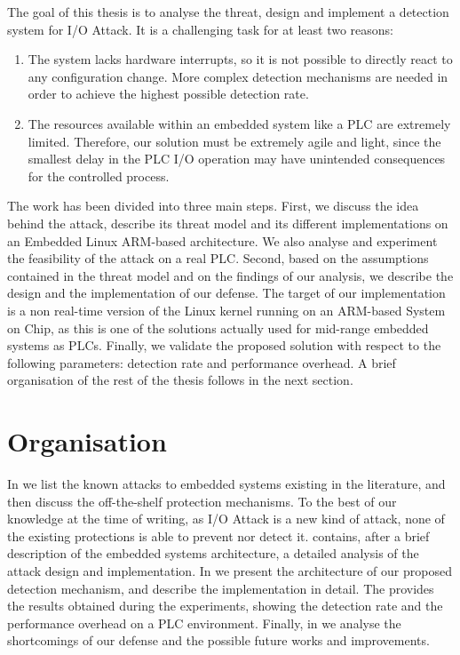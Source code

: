 The goal of this thesis is to analyse the threat, design and implement a detection system for I/O Attack.
It is a challenging task for at least two reasons:
\begin{enumerate}
	\item The system lacks hardware interrupts, so it is not possible to directly react to any configuration change. More complex detection mechanisms are needed
		in order to achieve the highest possible detection rate.
	\item The resources available within an embedded system like a PLC are extremely limited. Therefore, our solution must be extremely agile and light,
		since the smallest delay in the PLC I/O operation may have unintended consequences for the controlled process.
\end{enumerate}

The work has been divided into three main steps.
First, we discuss the idea behind the attack, describe its threat model and its different implementations on an Embedded Linux ARM-based architecture.
We also analyse and experiment the feasibility of the attack on a real PLC.
Second, based on the assumptions contained in the threat model and on the findings of our analysis, we describe the design and the implementation of our defense.
The target of our implementation is a non real-time version of the Linux kernel running on an ARM-based System on Chip,
as this is one of the solutions actually used for mid-range embedded systems as PLCs.
Finally, we validate the proposed solution with respect to the following parameters: detection rate and performance overhead.
A brief organisation of the rest of the thesis follows in the next section.


\section{Organisation}

In  we list the known attacks to embedded systems existing in the literature, and then discuss the off-the-shelf protection mechanisms.
To the best of our knowledge at the time of writing, as I/O Attack is a new kind of attack, none of the existing protections is able to prevent nor detect it.
 contains, after a brief description of the embedded systems architecture, a detailed analysis of the attack design and implementation.
In  we present the architecture of our proposed detection mechanism, and describe the implementation in detail.
The  provides the results obtained during the experiments, showing the detection rate and the performance overhead on a PLC environment.
Finally, in  we analyse the shortcomings of our defense and the possible future works and improvements.
